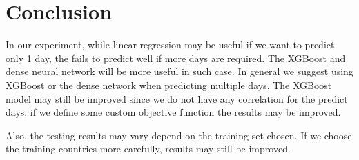 \documentclass[a4paper,12pt]{article}
\begin{document}
\section{Conclusion}
In our experiment, while linear regression may be useful if we want to predict only 1 day, the fails to predict well if more days are required. The XGBoost and dense neural network will be more useful in such case. In general we suggest using XGBoost or the dense network when predicting multiple days. The XGBoost model may still be improved since we do not have any correlation for the predict days, if we define some custom objective function the results may be improved.

Also, the testing results may vary depend on the training set chosen. If we choose the training countries more carefully, results may still be improved.
\end{document}
